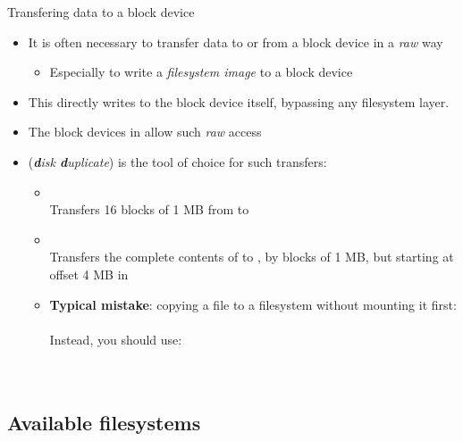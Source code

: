 \begin{frame}{Transfering data to a block device}
  \begin{itemize}
  \item It is often necessary to transfer data to or from a block
    device in a {\em raw} way
    \begin{itemize}
    \item Especially to write a {\em filesystem image} to a block
      device
    \end{itemize}
  \item This directly writes to the block device itself, bypassing any
    filesystem layer.
  \item The block devices in  allow such {\em raw} access
  \item {} ({\em {\bf d}isk {\bf d}uplicate})
    is the tool of choice for such transfers:
    \begin{itemize}
    \item {}\\
      Transfers 16 blocks of 1 MB from  to
    \item {}\\
      Transfers the complete contents of  to
      , by blocks of 1 MB, but starting at offset 4 MB
      in 
    \item {\bf Typical mistake}: copying a file to a filesystem without
      mounting it first:\\
      \\
      Instead, you should use:\\
      \\
      \\
    \end{itemize}
  \end{itemize}
\end{frame}

\subsection{Available filesystems}

